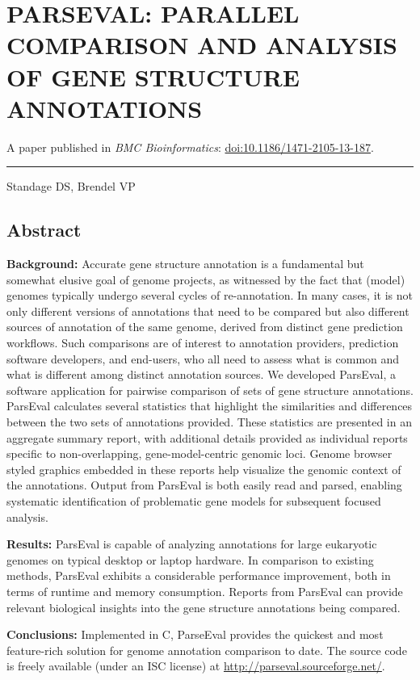 \chapter{PARSEVAL: PARALLEL COMPARISON AND ANALYSIS OF GENE STRUCTURE ANNOTATIONS}

A paper published in \textit{BMC Bioinformatics}: \href{http://dx.doi.org/10.1186/1471-2105-13-187}{doi:10.1186/1471-2105-13-187}.

\noindent\hfil\rule{0.5\textwidth}{.4pt}\hfil

Standage DS, Brendel VP

\section{Abstract}

\textbf{Background:} Accurate gene structure annotation is a fundamental but somewhat elusive goal of genome projects, as witnessed by the fact that (model) genomes typically undergo several cycles of re-annotation.
In many cases, it is not only different versions of annotations that need to be compared but also different sources of annotation of the same genome, derived from distinct gene prediction workflows.
Such comparisons are of interest to annotation providers, prediction software developers, and end-users, who all need to assess what is common and what is different among distinct annotation sources.
We developed ParsEval, a software application for pairwise comparison of sets of gene structure annotations.
ParsEval calculates several statistics that highlight the similarities and differences between the two sets of annotations provided.
These statistics are presented in an aggregate summary report, with additional details provided as individual reports specific to non-overlapping, gene-model-centric genomic loci.
Genome browser styled graphics embedded in these reports help visualize the genomic context of the annotations.
Output from ParsEval is both easily read and parsed, enabling systematic identification of problematic gene models for subsequent focused analysis.

\textbf{Results:} ParsEval is capable of analyzing annotations for large eukaryotic genomes on typical desktop or laptop hardware.
In comparison to existing methods, ParsEval exhibits a considerable performance improvement, both in terms of runtime and memory consumption.
Reports from ParsEval can provide relevant biological insights into the gene structure annotations being compared.

\textbf{Conclusions:} Implemented in C, ParseEval provides the quickest and most feature-rich solution for genome annotation comparison
to date.
The source code is freely available (under an ISC license) at \url{http://parseval.sourceforge.net/}.

